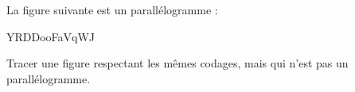 
\begin{exercice}\label{exo2smath-0325}

    La figure suivante est un parallélogramme :

YRDDooFaVqWJ

    Tracer une figure respectant les mêmes codages, mais qui n'est pas un parallélogramme.

\end{exercice}
